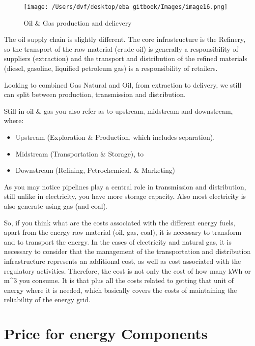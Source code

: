\documentclass[]{book}
\theoremstyle{definition}
\theoremstyle{definition}
\theoremstyle{definition}
\theoremstyle{remark}
\begin{document}
\begin{figure}[htbp]
\centering
\texttt{[image: /Users/dvf/desktop/eba gitbook/Images/image16.png]}
\caption{Oil \& Gas production and delievery}
\end{figure}

The oil supply chain is slightly different. The core infrastructure is
the Refinery, so the transport of the raw material (crude oil) is
generally a responsibility of suppliers (extraction) and the transport
and distribution of the refined materials (diesel, gasoline, liquified
petroleum gas) is a responsibility of retailers.

Looking to combined Gas Natural and Oil, from extraction to delivery, we
still can split between production, transmission and distribution.

Still in oil \& gas you also refer as to upstream, midstream and
downstream, where:

\begin{itemize}
\item
  Upstream (Exploration \& Production, which includes separation),
\item
  Midstream (Transportation \& Storage), to
\item
  Downstream (Refining, Petrochemical, \& Marketing)
\end{itemize}

As you may notice pipelines play a central role in transmission and
distribution, still unlike in electricity, you have more storage
capacity. Also most electricity is also generate using gas (and coal).

So, if you think what are the costs associated with the different energy
fuels, apart from the energy raw material (oil, gas, coal), it is
necessary to transform and to transport the energy. In the cases of
electricity and natural gas, it is necessary to consider that the
management of the transportation and distribution infrastructure
represents an additional cost, as well as cost associated with the
regulatory activities. Therefore, the cost is not only the cost of how
many kWh or m\^{}3 you consume. It is that plus all the costs related to
getting that unit of energy where it is needed, which basically covers
the costs of maintaining the reliability of the energy grid.

\section{Price for energy Components}\label{price-for-energy-components}
\end{document}
